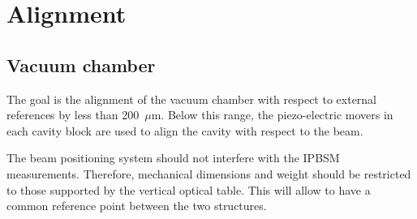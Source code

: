 \section{Alignment}
\subsection{Vacuum chamber}
The goal is the alignment of the vacuum chamber with respect to external references by less than 200~$\mu$m. Below this range, the piezo-electric movers in each cavity block are used to align the cavity with respect to the beam.\par
The beam positioning system should not interfere with the IPBSM measurements. Therefore, mechanical dimensions and weight should be restricted to those supported by the vertical optical table. This will allow to have a common reference point between the two structures.\par 
